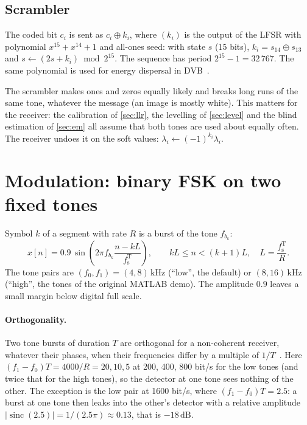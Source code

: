 \documentclass[11pt,a4paper]{article}
\newcommand{\kHz}{\,\mathrm{kHz}}
\newcommand{\dB}{\,\mathrm{dB}}
\newcommand{\fsT}{f_{\mathrm{s}}^{\mathrm{T}}}
\theoremstyle{remark}
\begin{document}
\subsection{Scrambler}
\label{sec:scrambler}
The coded bit $c_i$ is sent as $c_i \oplus k_i$, where $(k_i)$ is the output of the LFSR with polynomial $x^{15} + x^{14} + 1$ and all-ones seed: with state $s$ (15 bits), $k_i = s_{14} \oplus s_{13}$ and $s \leftarrow (2s + k_i) \bmod 2^{15}$. The sequence has period $2^{15} - 1 = 32\,767$. The same polynomial is used for energy dispersal in DVB~\cite{dvbs}.

The scrambler makes ones and zeros equally likely and breaks long runs of the same tone, whatever the message (an image is mostly white). This matters for the receiver: the calibration of \cref{sec:llr}, the levelling of \cref{sec:level} and the blind estimation of \cref{sec:em} all assume that both tones are used about equally often. The receiver undoes it on the soft values: $\lambda_i \leftarrow (-1)^{k_i} \lambda_i$.

\section{Modulation: binary FSK on two fixed tones}
\label{sec:mod}
Symbol $k$ of a segment with rate $R$ is a burst of the tone $f_{b_k}$:
\begin{equation}
x[n] = 0.9\, \sin\!\left( 2\pi f_{b_k} \frac{n - kL}{\fsT} \right), \qquad kL \le n < (k+1)L, \quad L = \frac{\fsT}{R}.
\label{eq:fsk}
\end{equation}
The tone pairs are $(f_0, f_1) = (4, 8)\kHz$ (``low'', the default) or $(8, 16)\kHz$ (``high'', the tones of the original MATLAB demo). The amplitude $0.9$ leaves a small margin below digital full scale.

\paragraph{Orthogonality.}
Two tone bursts of duration $T$ are orthogonal for a non-coherent receiver, whatever their phases, when their frequencies differ by a multiple of $1/T$~\cite{proakis}. Here $(f_1 - f_0)T = 4000/R = 20, 10, 5$ at 200, 400, 800 bit/s for the low tones (and twice that for the high tones), so the detector at one tone sees nothing of the other. The exception is the low pair at 1600 bit/s, where $(f_1 - f_0)T = 2.5$: a burst at one tone then leaks into the other's detector with a relative amplitude $|\operatorname{sinc}(2.5)| = 1/(2.5\pi) \approx 0.13$, that is $-18\dB$.
\end{document}
